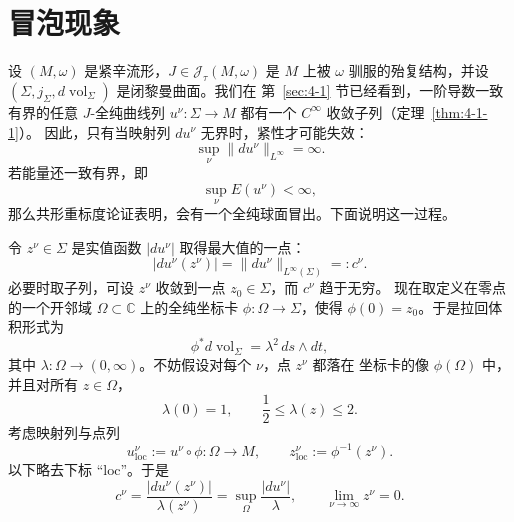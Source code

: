 
\section{冒泡现象}\label{sec:4-2}

设 $(M,\omega)$ 是紧辛流形，$J\in\mathcal J_\tau(M,\omega)$ 是 $M$ 上被
$\omega$ 驯服的殆复结构，并设
$(\Sigma,j_\Sigma,d\operatorname{vol}_\Sigma)$ 是闭黎曼曲面。我们在
第~\ref{sec:4-1} 节已经看到，一阶导数一致有界的任意 $J$-全纯曲线列
$u^\nu:\Sigma\to M$ 都有一个 $C^\infty$ 收敛子列（定理~\ref{thm:4-1-1}）。
因此，只有当映射列 $du^\nu$ 无界时，紧性才可能失效：
\[
  \sup_\nu\lVert du^\nu\rVert_{L^\infty}=\infty.
\]
若能量还一致有界，即
\[
  \sup_\nu E(u^\nu)<\infty,
\]
那么共形重标度论证表明，会有一个全纯球面冒出。下面说明这一过程。

令 $z^\nu\in\Sigma$ 是实值函数 $|du^\nu|$ 取得最大值的一点：
\[
  |du^\nu(z^\nu)|
  =\lVert du^\nu\rVert_{L^\infty(\Sigma)}=:c^\nu.
\]
必要时取子列，可设 $z^\nu$ 收敛到一点 $z_0\in\Sigma$，而 $c^\nu$ 趋于无穷。
现在取定义在零点的一个开邻域 $\Omega\subset\mathbb C$ 上的全纯坐标卡
$\phi:\Omega\to\Sigma$，使得 $\phi(0)=z_0$。于是拉回体积形式为
\[
  \phi^*d\operatorname{vol}_\Sigma=\lambda^2\,ds\wedge dt,
\]
其中 $\lambda:\Omega\to(0,\infty)$。不妨假设对每个 $\nu$，点 $z^\nu$ 都落在
坐标卡的像 $\phi(\Omega)$ 中，并且对所有
$z\in\Omega$，
\[
  \lambda(0)=1,
  \qquad
  \frac12\le\lambda(z)\le2.
\]
考虑映射列与点列
\[
  u^\nu_{\mathrm{loc}}:=u^\nu\circ\phi:\Omega\to M,
  \qquad
  z^\nu_{\mathrm{loc}}:=\phi^{-1}(z^\nu).
\]
以下略去下标 ``$\mathrm{loc}$''。于是
\[
  c^\nu
  =\frac{|du^\nu(z^\nu)|}{\lambda(z^\nu)}
  =\sup_\Omega\frac{|du^\nu|}{\lambda},
  \qquad
  \lim_{\nu\to\infty}z^\nu=0.
\]

